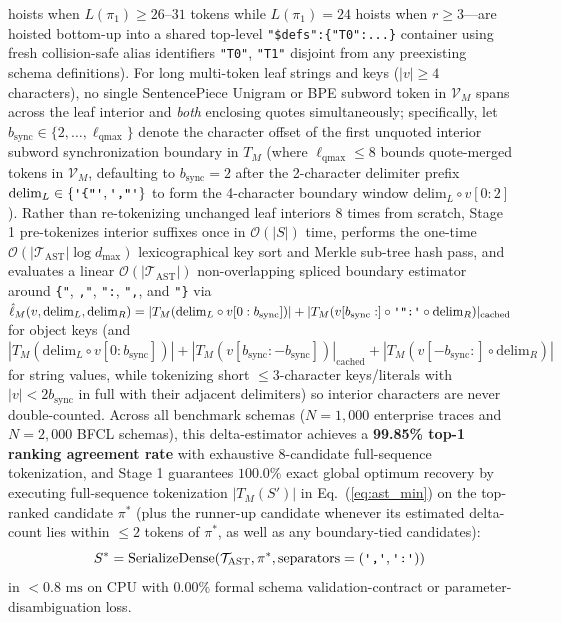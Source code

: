 \documentclass[conference,10pt]{IEEEtran}
\begin{document}
hoists when $L(\pi_1) \ge 26\text{--}31$ tokens while $L(\pi_1)=24$ hoists when $r \ge 3$---are hoisted bottom-up into a shared top-level \texttt{"\$defs":\allowbreak\{"T0":...\}} container using fresh collision-safe alias identifiers \texttt{"T0"}, \texttt{"T1"} disjoint from any preexisting schema definitions). For long multi-token leaf strings and keys ($|v| \ge 4$ characters), no single SentencePiece Unigram or BPE subword token in $\mathcal{V}_M$ spans across the leaf interior and \textit{both} enclosing quotes simultaneously; specifically, let $b_{\text{sync}} \in \{2, \dots, \ell_{\text{qmax}}\}$ denote the character offset of the first unquoted interior subword synchronization boundary in $T_M$ (where $\ell_{\text{qmax}} \le 8$ bounds quote-merged tokens in $\mathcal{V}_M$, defaulting to $b_{\text{sync}} = 2$ after the 2-character delimiter prefix $\text{delim}_L \in \{\texttt{\textquotesingle\{"\textquotesingle}, \texttt{\textquotesingle,"\textquotesingle}\}$ to form the 4-character boundary window $\text{delim}_L \circ v[0:2]$). Rather than re-tokenizing unchanged leaf interiors 8 times from scratch, Stage 1 pre-tokenizes interior suffixes once in $\mathcal{O}(|S|)$ time, performs the one-time $\mathcal{O}(|\mathcal{T}_{\text{AST}}| \log d_{\max})$ lexicographical key sort and Merkle sub-tree hash pass, and evaluates a linear $\mathcal{O}(|\mathcal{T}_{\text{AST}}|)$ non-overlapping spliced boundary estimator around \texttt{\textquotesingle\{"\textquotesingle}, \texttt{\textquotesingle,"\textquotesingle}, \texttt{\textquotesingle":\textquotesingle}, \texttt{\textquotesingle",\textquotesingle}, and \texttt{\textquotesingle"\}\textquotesingle} via $\hat{\ell}_M(v, \text{delim}_L, \text{delim}_R) = |T_M(\text{delim}_L \circ v[0:b_{\text{sync}}])| + |T_M(v[b_{\text{sync}}:] \circ \texttt{\textquotesingle":\textquotesingle} \circ \text{delim}_R)|_{\text{cached}}$ for object keys (and $|T_M(\text{delim}_L \circ v[0:b_{\text{sync}}])| + |T_M(v[b_{\text{sync}}:-b_{\text{sync}}])|_{\text{cached}} + |T_M(v[-b_{\text{sync}}:] \circ \text{delim}_R)|$ for string values, while tokenizing short $\le 3$-character keys/literals with $|v| < 2 b_{\text{sync}}$ in full with their adjacent delimiters) so interior characters are never double-counted. Across all benchmark schemas ($N=1{,}000$ enterprise traces and $N=2{,}000$ BFCL schemas), this delta-estimator achieves a \textbf{99.85\% top-1 ranking agreement rate} with exhaustive 8-candidate full-sequence tokenization, and Stage 1 guarantees $100.0\%$ exact global optimum recovery by executing full-sequence tokenization $|T_M(S')|$ in Eq.~(\ref{eq:ast_min}) on the top-ranked candidate $\pi^*$ (plus the runner-up candidate whenever its estimated delta-count lies within $\le 2$ tokens of $\pi^*$, as well as any boundary-tied candidates):
\begin{equation}
\label{eq:dense_serialization}
S^* = \operatorname{SerializeDense}(\mathcal{T}_{\text{AST}}, \pi^*, \text{separators} = (\texttt{\textquotesingle,\textquotesingle}, \texttt{\textquotesingle:\textquotesingle}))
\end{equation}
in $< 0.8\text{ ms}$ on CPU with $0.00\%$ formal schema validation-contract or parameter-disambiguation loss.
\end{document}
